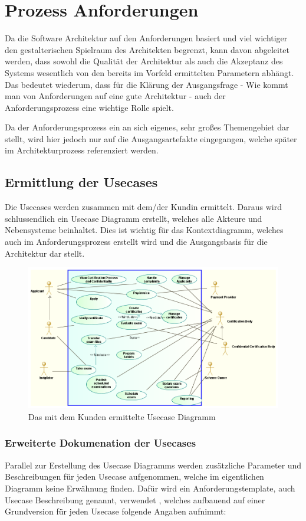 \chapter{Prozess Anforderungen}
Da die Software Architektur auf den Anforderungen basiert und viel wichtiger \glqq den gestalterischen Spielraum des Architekten\grqq \cite[S. 103]{softarch} begrenzt, kann davon abgeleitet werden, dass sowohl die Qualität der Architektur als auch die Akzeptanz des Systems wesentlich von den bereits im Vorfeld ermittelten Parametern abhängt. Das bedeutet wiederum, dass für die Klärung der Ausgangsfrage - Wie kommt man von Anforderungen auf eine gute Architektur - auch der Anforderungsprozess eine wichtige Rolle spielt.

Da der Anforderungsprozess ein an sich eigenes, sehr großes Themengebiet dar stellt, wird hier jedoch nur auf die Ausgangsartefakte eingegangen, welche später im Architekturprozess referenziert werden.

\section{Ermittlung der Usecases}
Die Usecases werden zusammen mit dem/der Kundin ermittelt. Daraus wird schlussendlich ein Usecase Diagramm erstellt, welches alle Akteure und Nebensysteme beinhaltet. Dies ist wichtig für das Kontextdiagramm, welches auch im Anforderungsprozess erstellt wird und die Ausgangsbasis für die Architektur dar stellt.

\begin{figure}[!htbp]
    \centering
    \includegraphics[scale=0.4]{uml/usecase.png}
    \caption{Das mit dem Kunden ermittelte Usecase Diagramm}
\end{figure}

\subsection{Erweiterte Dokumenation der Usecases}
Parallel zur Erstellung des Usecase Diagramms werden zusätzliche Parameter und Beschreibungen für jeden Usecase aufgenommen, welche im eigentlichen Diagramm keine Erwähnung finden.
Dafür wird ein Anforderungstemplate, auch Usecase Beschreibung genannt, verwendet \cite[S. 214]{reqman}, welches aufbauend auf einer Grundversion \cite[Abbildung 8.14, S. 215]{reqman} für jeden Usecase folgende Angaben aufnimmt:

